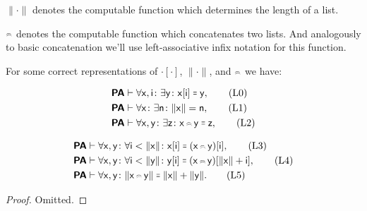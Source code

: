 \documentclass{article}
\theoremstyle{customstyle}
\newenvironment{prf}{\begin{mdframed}[skipabove=5pt, backgroundcolor=Gray!10, topline=false, bottomline=false, leftline=false, rightline=false]\begin{proof}}{\end{proof}\end{mdframed}}
\newcommand{\fm}[1]{\mathsf{#1}}
\DeclareMathOperator*{\Cat}{\mathrel{\scalebox{0.6}[0.7]{$\raisebox{0.25ex}{$\frown$}\mkern-17mu\raisebox{-0.25ex}{$\frown$}$}}}
\newcommand{\fmeq}{\mathrel{\resizebox{1.15\height}{1.15\height}{=}}}
\newcommand{\PA}{\textbf{\textsf{PA}}}
\begin{document}
\begin{definition}
  $\lVert \cdot \rVert$ denotes the computable function which determines the length of a list.
\end{definition}

\begin{definition}
  $\Cat$ denotes the computable function which concatenates two lists. And analogously to basic concatenation we'll use left-associative infix notation for this function.
\end{definition}

\begin{lemma}\label{lm-list}
  For some correct representations of $\cdot[\cdot]$, $\lVert \cdot \rVert$, and $\Cat$ we have:
  \newline
  \begin{minipage}{0.4\textwidth}
    \begin{align*}
       & \PA \vdash \forall \fm{x}, \fm{i} \colon \exists \fm{y} \colon \fm{x}[\fm{i}] \fmeq \fm{y}, \tag{L0} \label{lm-list.0}     \\
       & \PA \vdash \forall \fm{x} \colon \exists \fm{n} \colon \lVert \fm{x} \rVert = \fm{n}, \tag{L1} \label{lm-list.1}           \\
       & \PA \vdash \forall \fm{x}, \fm{y} \colon \exists \fm{z} \colon \fm{x} \Cat \fm{y} \fmeq \fm{z}, \tag{L2} \label{lm-list.2}
    \end{align*}
  \end{minipage}
  \begin{minipage}{0.5\textwidth}
    \begin{align*}
       & \PA \vdash \forall \fm{x}, \fm{y} \colon \forall \fm{i} < \lVert \fm{x} \rVert \colon \fm{x}[\fm{i}] \fmeq (\fm{x} \Cat \fm{y})[\fm{i}] , \tag{L3} \label{lm-list.3}                       \\
       & \PA \vdash \forall \fm{x}, \fm{y} \colon \forall \fm{i} < \lVert \fm{y} \rVert \colon \fm{y}[\fm{i}] \fmeq (\fm{x} \Cat \fm{y})[\lVert \fm{x} \rVert + \fm{i}], \tag{L4} \label{lm-list.4} \\
       & \PA \vdash \forall \fm{x}, \fm{y} \colon \lVert \fm{x} \Cat \fm{y} \rVert \fmeq \lVert \fm{x} \rVert + \lVert \fm{y} \rVert. \tag{L5} \label{lm-list.5}
    \end{align*}
  \end{minipage}
\end{lemma}

\begin{prf}
  Omitted.
\end{prf}
\end{document}
